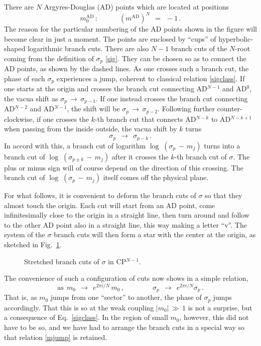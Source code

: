 \documentclass[epsfig,12pt]{article}
\def\beq{\begin{equation}}
\def\eeq{\end{equation}}
\def\beq{\begin{equation}}
\def\eeq{\end{equation}}
\begin{document}
	There are $ N $ Argyres-Douglas (AD) points \cite{AD} which are located at positions
\beq
	m_0^\text{AD} \,: \qquad\quad \left( m^\text{AD} \right)^N ~~=~~ -1 \,.
\eeq
	The reason for the particular numbering of the AD points shown in the figure will become clear in just a moment.
	The points are enclosed by ``cups'' of hyperbolic-shaped logarithmic branch cuts.
	There are also $ N - 1 $ branch cuts of the $ N $-root coming from the definition of $ \sigma_p $ \eqref{sig}.
	They can be chosen so as to connect the AD points, as shown by the dashed lines.
	As one crosses such a branch cut, the phase of each $ \sigma_p $ experiences a jump, 
	coherent to classical relation \eqref{sigclass}. 
	If one starts at the origin and crosses the branch cut connecting AD$^{N-1}$ and AD$^0$, 
	the vacua shift as $ \sigma_p \,\to\, \sigma_{p-1} $.
	If one instead crosses the branch cut connecting AD$^{N-2}$ and AD$^{N-1}$,
	the shift will be $ \sigma_p \,\to\, \sigma_{p-2} $.
	Following further counter-clockwise, if one crosses the $ k $-th branch cut 
	that connects AD$^{N-k}$ to AD$^{N-k+1}$ when passing from the inside outside, the vacua shift by $ k $ turns
\beq
\label{sigshift}
	\sigma_p ~~\to~~ \sigma_{p-k} \,.
\eeq
	In accord with this, a branch cut of logarithm $ \log\;( \sigma_p \,-\, m_j ) $ turns into 
	a branch cut of $ \log\;( \sigma_{p \pm k} \,-\, m_j ) $ after it crosses the $ k $-th branch cut of $ \sigma $. 
	The plus or minus sign will of course depend on the direction of this crossing. 
	The branch cut of $ \log\;( \sigma_p \,-\, m_j ) $ itself comes off the physical plane.

	For what follows, it is convenient to deform the branch cuts of $ \sigma $ so that they almost touch the origin.
	Each cut will start from an AD point, come infinitesimally close to the origin in a straight line, 
	then turn around and follow to the other AD point also in a straight line, this way making a letter ``v''.
	The system of the $ \sigma $ branch cuts will then form a star with the center at the origin, as sketched in Fig.~\ref{fsigcpn}.
\begin{figure}
\begin{center}
\epsfxsize=8.0cm
\caption{Stretched branch cuts of $ \sigma $ in CP$^{N-1}$.}
\label{fsigcpn}
\end{center}
\end{figure}
	The convenience of such a configuration of cuts now shows in a simple relation,
\beq
\label{mjump}
	\text{as}~~ m_0 ~~\to~~ e^{2\pi i / N}\, m_0\,,  \qquad\qquad \sigma_p ~~\to~~ e^{2\pi i / N} \sigma_p\,.
\eeq
	That is, as $ m_0 $ jumps from one ``sector'' to another, the phase of $ \sigma_p $ jumps accordingly.
	That this is so at the weak coupling $ |m_0| \,\gg\, 1 $ is not a surprise, but a consequence of Eq.~\eqref{sigclass}.
	In the region of small $ m_0 $, however, this did not have to be so, and we have had to arrange the branch cuts 
	in a special way so that relation \eqref{mjump} is retained.
\end{document}
